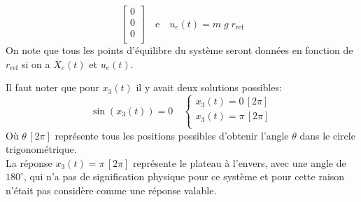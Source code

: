 \documentclass[class=article, crop=false]{standalone}
\begin{document}
\begin{resolution}
\begin{equation}
\begin{bmatrix}
            0\\
            0\\
            0\\
        \end{bmatrix}
        \quad\text{e}\quad
        u_e(t) = m \; g \; r_{\text{ref}}
    \end{equation}
    On note que tous les points d'équilibre du système seront données en fonction de $r_{\text{ref}}$ si on a $X_e(t)$ et $u_e(t)$.
    \begin{remark}
        Il faut noter que pour $x_3(t)$ il y avait deux solutions possibles:
        \begin{equation*}
            \sin(x_3(t)) = 0 
            \quad
            \begin{cases}
                x_3(t) = 0\,[2\pi]\\
                x_3(t) = \pi\,[2\pi]\\
            \end{cases}
        \end{equation*}
        Où $\theta\,[2\pi]$ représente tous les positions possibles d'obtenir l'angle $\theta$ dans le circle trigonométrique.\\
        
        La réponse $x_3(t) = \pi\,[2\pi]$ représente le plateau à l'envers, avec une angle de $180^{\circ}$, qui n'a pas de signification physique pour ce système et pour cette raison n'était pas considère comme une réponse valable.
    \end{remark}
\end{resolution}

\newpage
\end{document}
